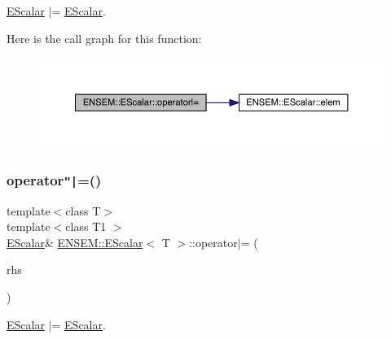 \mbox{\hyperlink{classENSEM_1_1EScalar}{E\+Scalar}} $\vert$= \mbox{\hyperlink{classENSEM_1_1EScalar}{E\+Scalar}}. 

Here is the call graph for this function\+:
\nopagebreak
\begin{figure}[H]
\begin{center}
\leavevmode
\includegraphics[width=350pt]{d0/d82/classENSEM_1_1EScalar_a95469ba3db6456ae2fa0c6d86d082c0a_cgraph}
\end{center}
\end{figure}
\mbox{\label{classENSEM_1_1EScalar_a95469ba3db6456ae2fa0c6d86d082c0a}} 
\subsubsection{\texorpdfstring{operator\texttt{"|}=()}{operator|=()}\hspace{0.1cm}{\footnotesize\ttfamily [2/3]}}
{\footnotesize\ttfamily template$<$class T$>$ \\
template$<$class T1 $>$ \\
\mbox{\hyperlink{classENSEM_1_1EScalar}{E\+Scalar}}\& \mbox{\hyperlink{classENSEM_1_1EScalar}{E\+N\+S\+E\+M\+::\+E\+Scalar}}$<$ T $>$\+::operator$\vert$= (\begin{DoxyParamCaption}\item[{const \mbox{\hyperlink{classENSEM_1_1EScalar}{E\+Scalar}}$<$ T1 $>$ \&}]{rhs }\end{DoxyParamCaption})\hspace{0.3cm}{\ttfamily [inline]}}



\mbox{\hyperlink{classENSEM_1_1EScalar}{E\+Scalar}} $\vert$= \mbox{\hyperlink{classENSEM_1_1EScalar}{E\+Scalar}}. 

